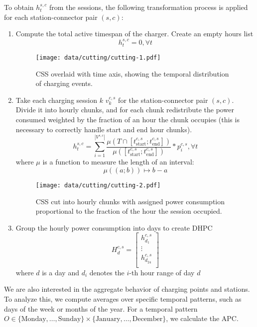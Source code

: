 To obtain $h^{s,c}_t$ from the sessions, the following transformation process is applied for each station-connector pair $(s,c)$:

\begin{enumerate}
    \item Compute the total active timespan of the charger. Create an empty hours list \[h^{s,c}_t = 0, \forall t\]
          \begin{figure}[H]
              \texttt{[image: data/cutting/cutting-1.pdf]}
              \caption{\acrlong{CSS} overlaid with time axis, showing the temporal distribution of charging events.}
          \end{figure}
    \item Take each charging session $k$ $v^{c,s}_k$ for the station-connector pair $(s,c)$. Divide it into hourly chunks, and for each chunk redistribute the power consumed weighted by the fraction of an hour the chunk occupies (this is necessary to correctly handle start and end hour chunks).
          \[
              h_t^{s,c} = \sum_{i = 1}^{|V^{s,c}|}
              \frac{
                  \mu(T \cap [t_{\text{start}}^{c,s}; t_{\text{end}}^{c,s}])
              }{
                  \mu([t_{\text{start}}^{c,s}; t_{\text{end}}^{c,s}])
              }
              *
              p_i^{c,s}, \forall t
          \]
          where $\mu$ is a function to measure the length of an interval: \[\mu((a;b)) \mapsto b - a\]
          \begin{figure}[H]
              \texttt{[image: data/cutting/cutting-2.pdf]}
              \caption{\acrlong{CSS} cut into hourly chunks with assigned power consumption proportional to the fraction of the hour the session occupied.}
          \end{figure}
    \item Group the hourly power consumption into days to create \acrlong{DHPC}
          \[H_d^{c,s} =
              \begin{bmatrix}
                  h^{c,s}_{d_1}    \\
                  \vdots           \\
                  h^{c,s}_{d_{24}} \\
              \end{bmatrix}
          \] where $d$ is a day and $d_i$ denotes the $i$-th hour range of day $d$
\end{enumerate}


We are also interested in the aggregate behavior of charging points and stations. To analyze this, we compute averages over specific temporal patterns, such as days of the week or months of the year. For a temporal pattern $O \in \{\text{Monday}, \dots, \text{Sunday} \} \times \{ \text{January}, \dots, \text{December} \}$, we calculate the \acrlong{APC}.

